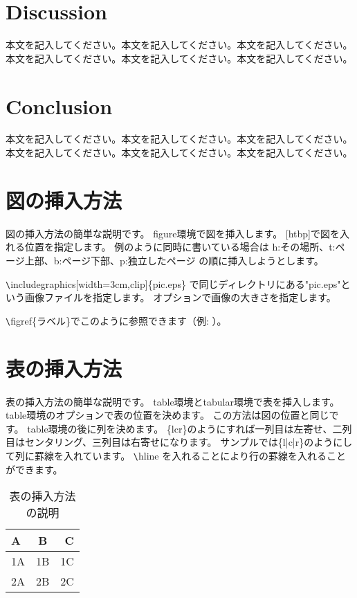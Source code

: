 \documentclass[a4paper,10pt,oneside,twocolumn,notitlepage,final]{jarticle}
\begin{document}
\section{Discussion}
本文を記入してください。本文を記入してください。本文を記入してください。本文を記入してください。本文を記入してください。本文を記入してください。


\section{Conclusion}
本文を記入してください。本文を記入してください。本文を記入してください。本文を記入してください。本文を記入してください。本文を記入してください。


\section{図の挿入方法}
図の挿入方法の簡単な説明です。
figure環境で図を挿入します。
[htbp]で図を入れる位置を指定します。
例のように同時に書いている場合は
h:その場所、t:ページ上部、b:ページ下部、p:独立したページ
の順に挿入しようとします。



\verb+\+includegraphics[width=3cm,clip]\{pic.eps\}
で同じディレクトリにある"pic.eps"という画像ファイルを指定します。
オプションで画像の大きさを指定します。

\verb+\+figref\{ラベル\}でこのように参照できます（例: ）。

\section{表の挿入方法}
表の挿入方法の簡単な説明です。
table環境とtabular環境で表を挿入します。
table環境のオプションで表の位置を決めます。
この方法は図の位置と同じです。
table環境の後に列を決めます。
\{lcr\}のようにすれば一列目は左寄せ、二列目はセンタリング、三列目は右寄せになります。
サンプルでは\{l|c|r\}のようにして列に罫線を入れています。
\verb+\+hline を入れることにより行の罫線を入れることができます。

\begin{table}[htb]
 \caption{表の挿入方法の説明}
  \centering
   \begin{tabular}{|l|c|r|} \hline
     A & B & C  \\ \hline
     1A & 1B & 1C  \\
     2A & 2B & 2C  \\ \hline
   \end{tabular}
  \label{table}%
\end{table}
\end{document}
